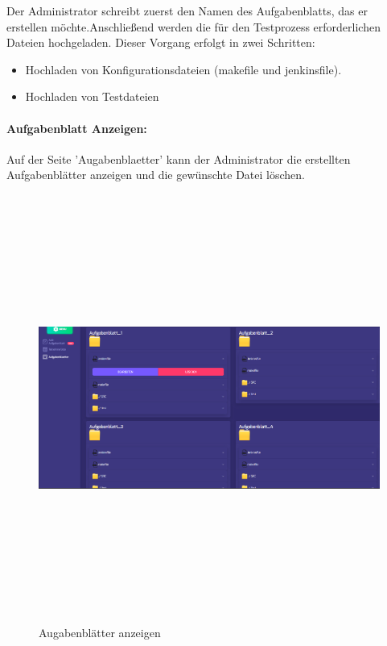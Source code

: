 \documentclass[a4paper,12pt,oneside]{book}
\begin{document}
\newline
Der Administrator schreibt zuerst den Namen des Aufgabenblatts, das er erstellen möchte.Anschließend werden die für den Testprozess erforderlichen Dateien hochgeladen. Dieser Vorgang erfolgt in zwei Schritten:
\begin{itemize}
	\item Hochladen von Konfigurationsdateien (makefile und jenkinsfile).
	\item Hochladen von Testdateien 
\end{itemize}
\newpage
\paragraph{Aufgabenblatt Anzeigen: } Auf der Seite 'Augabenblaetter' kann der Administrator die erstellten Aufgabenblätter anzeigen und die gewünschte Datei löschen.
\begin{figure}[h!]
	\begin{center}
		\includegraphics[width=18cm, height=14cm]{aufgabenblaetter.PNG}
		\caption{Augabenblätter anzeigen} 
		\label{Augabenblätter anzeigen} 
	\end{center}
\end{figure}
\newpage
\end{document}
